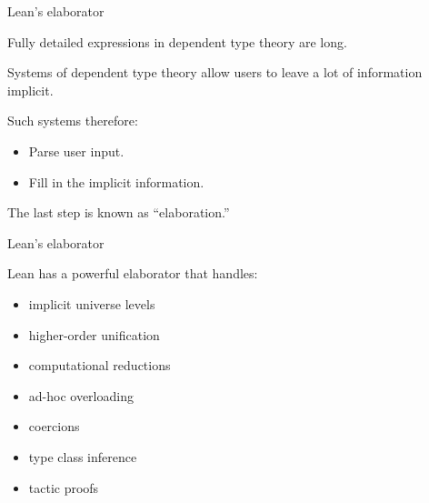 \documentclass[xcolor=table]{beamer}
\newcommand{\na}{\mbox{}\\}
\newcommand{\nc}{\mbox{}\\[6pt]}
\begin{document}
\begin{frame}{Lean's elaborator}

Fully detailed expressions in dependent type theory are long.

\bigskip

Systems of dependent type theory allow users to leave a lot of information implicit.

\bigskip

Such systems therefore:
\begin{itemize}
 \item Parse user input.
 \item Fill in the implicit information.
\end{itemize}
The last step is known as ``elaboration.''

\end{frame}


\begin{frame}{Lean's elaborator}

Lean has a powerful elaborator that handles:
\begin{itemize}
 \item implicit universe levels
 \item higher-order unification
 \item computational reductions
 \item ad-hoc overloading
 \item coercions
 \item type class inference
 \item tactic proofs
\end{itemize}

\end{frame}



\end{document}
